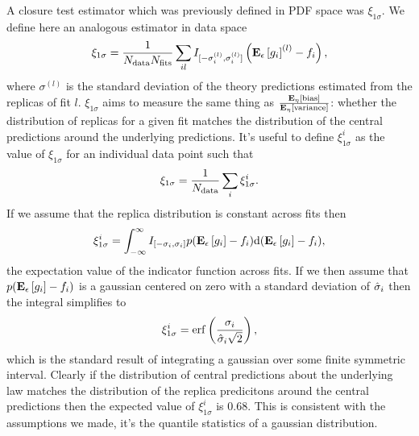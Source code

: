 A closure test estimator which was previously defined in PDF space was $\xi_{1\sigma}$.
We define here an analogous estimator in data space
\begin{equation}
    \xi_{1\sigma} = \frac{1}{N_{\rm data} N_{\rm fits}} \sum_{il}
    I_{[-\sigma_i^{(l)}, \sigma_i^{(l)}]}
    \left( \mathbf{E}_{\epsilon}\left[ g_i \right]^{(l)} - f_i \right),
\end{equation}
where $\sigma^{(l)}$ is the standard deviation of the theory predictions
estimated from the replicas of fit $l$. $\xi_{1\sigma}$ aims to measure the same
thing as $\frac{\mathbf{E}_{\eta}\left[ {\rm bias} \right]}{\mathbf{E}_{\eta}\left[ {\rm variance} \right]}$: whether the distribution of
replicas for a given fit matches the distribution of the central predictions
around the underlying predictions. It's useful to define $\xi_{1\sigma}^{i}$ as
the value of $\xi_{1\sigma}$ for an individual data point
such that
\begin{equation}
    \xi_{1\sigma} = \frac{1}{N_{\rm data}} \sum_i \xi_{1\sigma}^{i}.
\end{equation}
If we assume that
the replica distribution is constant across
fits then
\begin{equation}
    \xi_{1\sigma}^{i} = \int_{-\infty}^{\infty} I_{[-\sigma_i, \sigma_i]}
    p(\mathbf{E}_{\epsilon}\left[ g_i \right] - f_i)
    {\rm d}(\mathbf{E}_{\epsilon}\left[ g_i \right] - f_i),
\end{equation}
the expectation value of the indicator function across fits.
If we then assume that $p(\mathbf{E}_{\epsilon}\left[ g_i \right] - f_i)$ is a gaussian centered on zero
with a standard deviation of $\hat{\sigma}_i$ then the integral simplifies to
\begin{equation}
    \xi_{1\sigma}^{i} = {\rm erf} \left( \frac{\sigma_i}{\hat{\sigma}_i \sqrt{2}}\right),
    \label{eq:expectedxi}
\end{equation}
which is the standard result of integrating a gaussian over some finite symmetric
interval. Clearly if the distribution of central predictions about the underlying law
matches the distribution of the replica predicitons around the central predictions
then the expected value of $\xi_{1\sigma}^{i}$ is 0.68. This is consistent with
the assumptions we made, it's the quantile statistics of a gaussian distribution.

